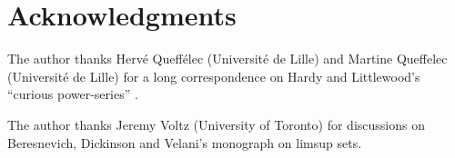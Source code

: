 \documentclass{article}
\begin{document}
\section*{Acknowledgments}
The author thanks Hervé Queffélec (Université de Lille) and Martine Queffelec (Université de Lille) for a long correspondence on Hardy and Littlewood's
``curious power-series'' \cite{XXIV}. 

The author thanks Jeremy Voltz (University of Toronto) for discussions on Beresnevich, Dickinson and Velani's monograph \cite{limsup} on limsup sets.



\end{document}
